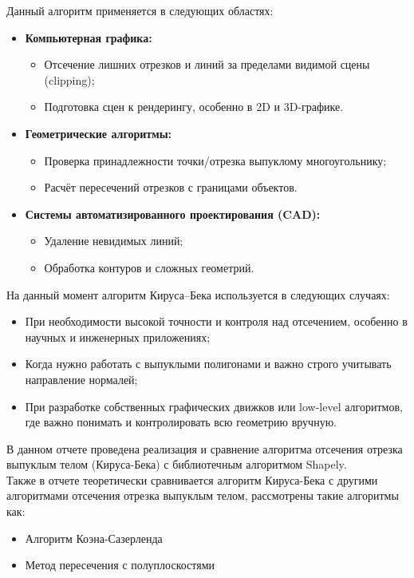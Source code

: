 \documentclass[areasetadvanced]{scrartcl}
\begin{document}
Данный алгоритм применяется в следующих областях:

\begin{itemize}
    \item \textbf{Компьютерная графика:}
    \begin{itemize}
        \item Отсечение лишних отрезков и линий за пределами видимой сцены (clipping);
        \item Подготовка сцен к рендерингу, особенно в 2D и 3D-графике.
    \end{itemize}
    
    \item \textbf{Геометрические алгоритмы:}
    \begin{itemize}
        \item Проверка принадлежности точки/отрезка выпуклому многоугольнику;
        \item Расчёт пересечений отрезков с границами объектов.
    \end{itemize}
    
    \item \textbf{Системы автоматизированного проектирования (CAD):}
    \begin{itemize}
        \item Удаление невидимых линий;
        \item Обработка контуров и сложных геометрий.
    \end{itemize}
\end{itemize}

На данный момент алгоритм Кируса–Бека используется в следующих случаях:

\begin{itemize}
    \item При необходимости высокой точности и контроля над отсечением, особенно в научных и инженерных приложениях;
    \item Когда нужно работать с выпуклыми полигонами и важно строго учитывать направление нормалей;
    \item При разработке собственных графических движков или low-level алгоритмов, где важно понимать и контролировать всю геометрию вручную.
\end{itemize}
В данном отчете проведена реализация и сравнение алгоритма отсечения отрезка выпуклым телом (Кируса-Бека) с библиотечным алгоритмом Shapely.\\ 

Также в отчете теоретически сравнивается алгоритм Кируса-Бека с другими алгоритмами отсечения отрезка выпуклым телом, рассмотрены такие алгоритмы как:
\begin{itemize}
    \item Алгоритм Коэна-Сазерленда
    \item Метод пересечения с полуплоскостями
\end{itemize}
\newpage
\end{document}
